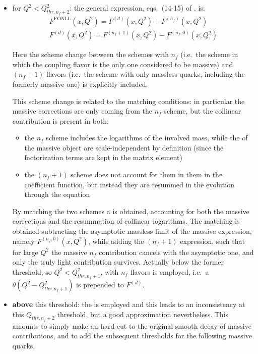 \begin{itemize}
  \item for \textbf{$Q^2 < Q_{thr,n_f+2}^2$}: the general expression,
    eqs.~(14-15) of \cite{Forte:2010ta}, is:
    \begin{align}
        F^{\text{FONLL}}(x, Q^2) = F^{(d)}(x, Q^2) + F^{(n_f)}(x, Q^2)\\
        F^{(d)}(x, Q^2) = F^{(n_f + 1)}(x, Q^2) - F^{(n_f, 0)}(x, Q^2)
        \label{eq:dis/fonll}
    \end{align}

    Here the scheme change between the schemes with $n_f$ (i.e.\ the \ffns
    scheme in which the coupling flavor is the only one considered to be
    massive) and $(n_f + 1)$ flavors (i.e.\ the \ffns scheme with only massless
    quarks, including the formerly massive one) is explicitly included.

    This scheme change is related to the \dglap matching conditions: in
    particular the massive corrections are only coming from the $n_f$
    scheme, but the collinear contribution is present in both:
    \begin{itemize}
      \item the $n_f$ scheme includes the logarithms of the involved mass,
          while the \pdf of the massive object are scale-independent by definition
          (since the factorization terms are kept in the matrix element)
      \item the $(n_f + 1)$ scheme does not account for them in them in the coefficient
          function, but instead they are resummed in the \pdf evolution through the
          \dglap equation
    \end{itemize}

    By matching the two schemes a \gmvfns is obtained, accounting for both the
    massive corrections and the resummation of collinear logarithms.
    The matching is obtained subtracting the asymptotic massless limit of the
    massive expression, namely $F^{(n_f, 0)}(x, Q^2)$, while adding the
    $(n_f + 1)$ expression, such that for large $Q^2$ the massive
    $n_f$ contribution cancels with the asymptotic one, and only the truly
    light contribution survives.
    Actually below the former threshold, so $Q^2 < Q_{thr,n_f+1}^2$, \fns
    with $n_f$ flavors is employed, i.e.\ a $\theta(Q^2 - Q_{thr,n_f+1}^2)$ is
    prepended to $F^{(d)}$.

  \item \textbf{above} this threshold: the \zmvfns is employed and this leads
    to an inconsistency at this $Q_{thr,n_f+2}$ threshold, but a good
    approximation nevertheless.
    This amounts to simply make an hard cut to the original smooth decay of
    massive contributions, and to add the subsequent thresholds for the following
    massive quarks.
\end{itemize}

